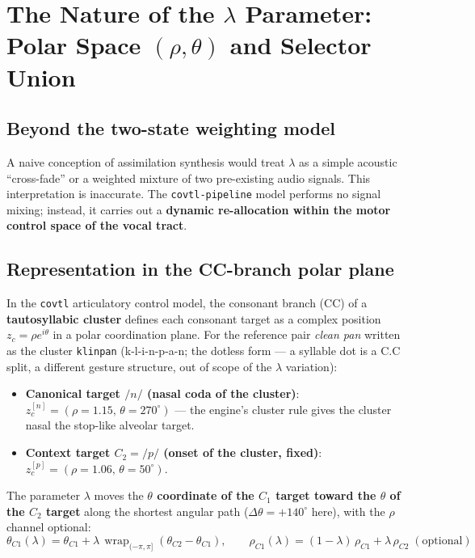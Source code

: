 \documentclass[11pt,a4paper]{article}
\begin{document}
\section{The Nature of the $\lambda$ Parameter: Polar Space $(\rho, \theta)$ and Selector Union}

\subsection{Beyond the two-state weighting model}
A naive conception of assimilation synthesis would treat $\lambda$ as a simple acoustic ``cross-fade'' or a weighted mixture of two pre-existing audio signals. This interpretation is inaccurate. The \texttt{covtl-pipeline} model performs no signal mixing; instead, it carries out a \textbf{dynamic re-allocation within the motor control space of the vocal tract}.

\subsection{Representation in the CC-branch polar plane}
In the \texttt{covtl} articulatory control model, the consonant branch (CC) of a \textbf{tautosyllabic cluster} defines each consonant target as a complex position $z_c = \rho e^{i\theta}$ in a polar coordination plane.  For the reference pair \textit{clean pan} written as the cluster \texttt{klinpan} (k-l-i-n-p-a-n; the dotless form --- a syllable dot is a C.C split, a different gesture structure, out of scope of the $\lambda$ variation):
\begin{itemize}[leftmargin=*]
    \item \textbf{Canonical target $/n/$ (nasal coda of the cluster)}: $z_c^{[n]} = (\rho = 1.15,\, \theta = 270^\circ)$ --- the engine's cluster rule gives the cluster nasal the stop-like alveolar target.
    \item \textbf{Context target $C_2 = /p/$ (onset of the cluster, fixed)}: $z_c^{[p]} = (\rho = 1.06,\, \theta = 50^\circ)$.
\end{itemize}

The parameter $\lambda$ moves the \textbf{$\theta$ coordinate of the $C_1$ target toward the $\theta$ of the $C_2$ target} along the shortest angular path ($\Delta\theta = +140^\circ$ here), with the $\rho$ channel optional:
\begin{equation}
\theta_{C1}(\lambda) = \theta_{C1} + \lambda \,\operatorname{wrap}_{(-\pi,\pi]}\!\left(\theta_{C2} - \theta_{C1}\right),
\qquad \rho_{C1}(\lambda) = (1-\lambda)\,\rho_{C1} + \lambda\,\rho_{C2} \;(\text{optional})
\end{equation}
\end{document}
